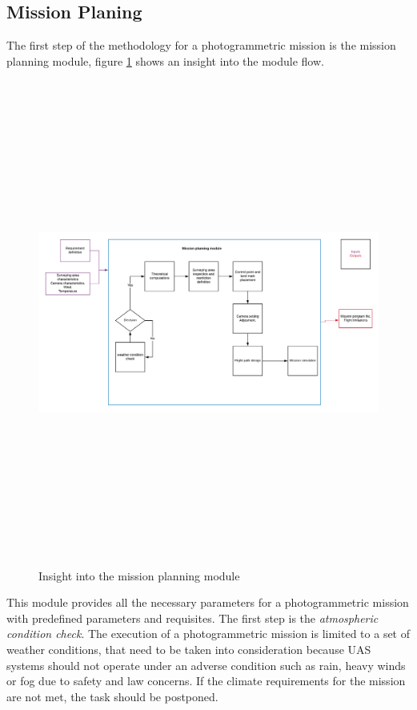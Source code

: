 \subsection{Mission Planing}
The first step of the methodology for a photogrammetric mission is the mission planning module, figure \ref{fig:MissionModule} shows an insight into the module flow.
\begin{figure}[H]
\centering
\includegraphics[width=16cm,height=16cm,keepaspectratio]{imagenes/Missionplanning.png}
\caption{Insight into the mission planning module}
\label{fig:MissionModule}
\end{figure}
This module provides all the necessary parameters for a photogrammetric mission with predefined parameters and requisites. The first step is the \textit{atmospheric condition check}. The execution of a photogrammetric mission is limited to a set of weather conditions, that need to be taken into consideration because UAS systems should not operate under an adverse condition such as rain, heavy winds or fog due to safety and law concerns. If the climate requirements for the mission are not met, the task should be postponed.

